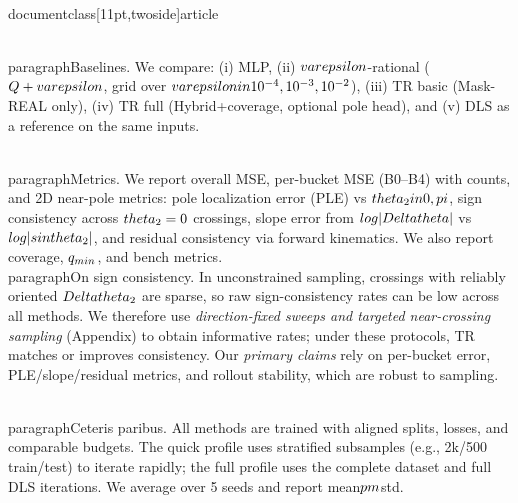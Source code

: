 \\documentclass[11pt,twoside]{article}
\begin{document}
\\paragraph{Baselines.} We compare: (i) MLP, (ii) $\\varepsilon$-rational ($Q+\\varepsilon$, grid over $\\varepsilon\\in\\{10^{-4},10^{-3},10^{-2}\\}$), (iii) TR basic (Mask-REAL only), (iv) TR full (Hybrid+coverage, optional pole head), and (v) DLS as a reference on the same inputs.

\\paragraph{Metrics.} We report overall MSE, per-bucket MSE (B0--B4) with counts, and 2D near-pole metrics: pole localization error (PLE) vs $\\theta_2\\in\\{0,\\pi\\}$, sign consistency across $\\theta_2=0$ crossings, slope error from $\\log\\|\\Delta\\theta\\|$ vs $\\log|\\sin\\theta_2|$, and residual consistency via forward kinematics. We also report coverage, $q_{\\min}$, and bench metrics.
\\paragraph{On sign consistency.} In unconstrained sampling, crossings with reliably oriented $\\Delta\\theta_2$ are sparse, so raw sign-consistency rates can be low across all methods. We therefore use \emph{direction-fixed sweeps and targeted near-crossing sampling} (Appendix) to obtain informative rates; under these protocols, TR matches or improves consistency. Our \emph{primary claims} rely on per-bucket error, PLE/slope/residual metrics, and rollout stability, which are robust to sampling.

\\paragraph{Ceteris paribus.} All methods are trained with aligned splits, losses, and comparable budgets. The quick profile uses stratified subsamples (e.g., 2k/500 train/test) to iterate rapidly; the full profile uses the complete dataset and full DLS iterations. We average over 5 seeds and report mean$\\pm$std.
\end{document}
